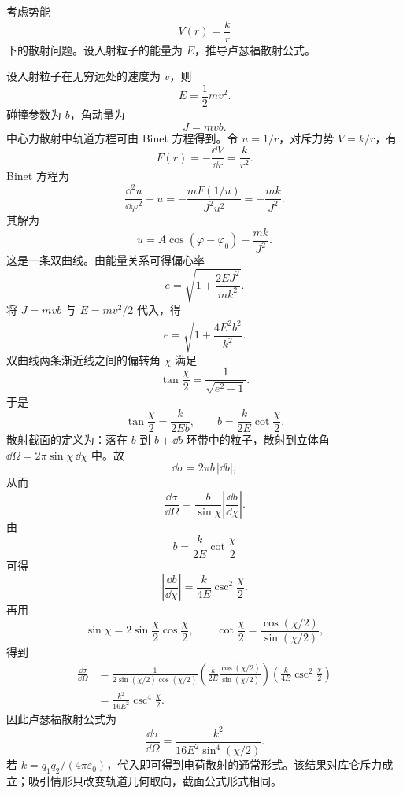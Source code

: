 \begin{question}[卢瑟福散射]
考虑势能
\[
  V(r)=\frac{k}{r}
\]
下的散射问题。设入射粒子的能量为 $E$，推导卢瑟福散射公式。

\begin{solution}
设入射粒子在无穷远处的速度为 $v$，则
\[
  E=\frac12mv^2.
\]
碰撞参数为 $b$，角动量为
\[
  J=mvb.
\]
中心力散射中轨道方程可由 Binet 方程得到。令 $u=1/r$，对斥力势 $V=k/r$，有
\[
  F(r)=-\frac{\dd V}{\dd r}=\frac{k}{r^2}.
\]
Binet 方程为
\[
  \frac{\dd^2u}{\dd\varphi^2}+u=-\frac{mF(1/u)}{J^2u^2}
  =-\frac{mk}{J^2}.
\]
其解为
\[
  u=A\cos(\varphi-\varphi_0)-\frac{mk}{J^2}.
\]
这是一条双曲线。由能量关系可得偏心率
\[
  e=\sqrt{1+\frac{2EJ^2}{mk^2}}.
\]
将 $J=mvb$ 与 $E=mv^2/2$ 代入，得
\[
  e=\sqrt{1+\frac{4E^2b^2}{k^2}}.
\]
双曲线两条渐近线之间的偏转角 $\chi$ 满足
\[
  \tan\frac\chi2=\frac{1}{\sqrt{e^2-1}}.
\]
于是
\[
  \tan\frac\chi2=\frac{k}{2Eb},
  \qquad
  \boxed{b=\frac{k}{2E}\cot\frac\chi2.}
\]
散射截面的定义为：落在 $b$ 到 $b+\dd b$ 环带中的粒子，散射到立体角 $\dd\Omega=2\pi\sin\chi\,\dd\chi$ 中。故
\[
  \dd\sigma=2\pi b\,|\dd b|,
\]
从而
\[
  \frac{\dd\sigma}{\dd\Omega}
  =\frac{b}{\sin\chi}\left|\frac{\dd b}{\dd\chi}\right|.
\]
由
\[
  b=\frac{k}{2E}\cot\frac\chi2
\]
可得
\[
  \left|\frac{\dd b}{\dd\chi}\right|
  =\frac{k}{4E}\csc^2\frac\chi2.
\]
再用
\[
  \sin\chi=2\sin\frac\chi2\cos\frac\chi2,
  \qquad
  \cot\frac\chi2=\frac{\cos(\chi/2)}{\sin(\chi/2)},
\]
得到
\begin{align*}
  \frac{\dd\sigma}{\dd\Omega}
  &=\frac{1}{2\sin(\chi/2)\cos(\chi/2)}
    \left(\frac{k}{2E}\frac{\cos(\chi/2)}{\sin(\chi/2)}\right)
    \left(\frac{k}{4E}\csc^2\frac\chi2\right) \\
  &=\frac{k^2}{16E^2}\csc^4\frac\chi2.
\end{align*}
因此卢瑟福散射公式为
\[
  \boxed{\frac{\dd\sigma}{\dd\Omega}
  =\frac{k^2}{16E^2\sin^4(\chi/2)}.}
\]
若 $k=q_1q_2/(4\pi\varepsilon_0)$，代入即可得到电荷散射的通常形式。该结果对库仑斥力成立；吸引情形只改变轨道几何取向，截面公式形式相同。
\end{solution}
\end{question}
